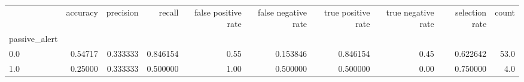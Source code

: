 \begin{tabular}{lrrrrrrrrr}
\toprule
{} &  accuracy &  precision &    recall &  false positive rate &  false negative rate &  true positive rate &  true negative rate &  selection rate &  count \\
passive\_alert &           &            &           &                      &                      &                     &                     &                 &        \\
\midrule
0.0           &   0.54717 &   0.333333 &  0.846154 &                 0.55 &             0.153846 &            0.846154 &                0.45 &        0.622642 &   53.0 \\
1.0           &   0.25000 &   0.333333 &  0.500000 &                 1.00 &             0.500000 &            0.500000 &                0.00 &        0.750000 &    4.0 \\
\bottomrule
\end{tabular}
